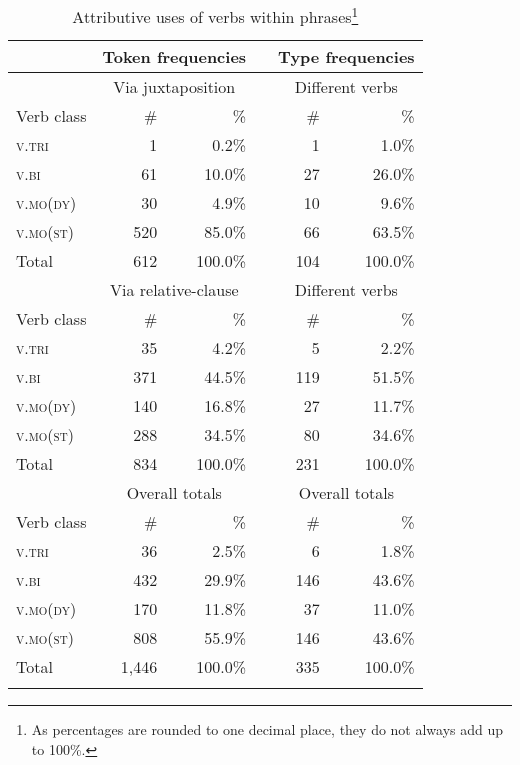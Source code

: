 \begin{table}

\caption[Attributive uses of verbs within  phrases]{Attributive uses of verbs within  phrases\footnote{As percentages are rounded to one decimal place, they do not always add up to 100\%.}}\label{Table_5.16}
\centering
\begin{tabular}{l*{5}{r}}
\lsptoprule
 & \multicolumn{2}{c}{ Token frequencies} & & \multicolumn{2}{c}{Type frequencies}\\
\midrule
 & \multicolumn{2}{c}{ Via juxtaposition} &  & \multicolumn{2}{c}{Different verbs}\\
Verb class &  \# &  \%  & &  \# &  \%\\
\textsc{v.tri} &  1 &  0.2\%  & &  1 &  1.0\%\\
\textsc{v.bi} &  61 &  10.0\% &  &  27 &  26.0\%\\
\textsc{v.mo}(\textsc{dy}) &  30 &  4.9\%  & &  10 &  9.6\%\\
\textsc{v.mo}(\textsc{st}) &  520 &  85.0\% &  &  66 &  63.5\%\\
\midrule
Total &  612 &  100.0\%  & &  104 &  100.0\%\\
\midrule
& \multicolumn{2}{c}{ Via relative-clause}  & & \multicolumn{2}{c}{ Different verbs}\\
Verb class &  \# &  \% &  &  \# &  \%\\
\textsc{v.tri} &  35 &  4.2\% & &   5 &  2.2\%\\
\textsc{v.bi} &  371 &  44.5\% &  &  119 &  51.5\%\\
\textsc{v.mo}(\textsc{dy}) &  140 &  16.8\% &  &  27 &  11.7\%\\
\textsc{v.mo}(\textsc{st}) &  288 &  34.5\% &  &  80 &  34.6\%\\
\midrule
Total &  834 &  100.0\% & &   231 &  100.0\%\\
\midrule
& \multicolumn{2}{c}{ Overall totals} &  & \multicolumn{2}{c}{ Overall totals}\\
Verb class &  \# &  \% & &   \# &  \%\\
\textsc{v.tri} &  36 &  2.5\%  & &  6 &  1.8\%\\
\textsc{v.bi} &  432 &  29.9\%  & &  146 &  43.6\%\\
\textsc{v.mo}(\textsc{dy}) &  170 &  11.8\% & &   37 &  11.0\%\\
\textsc{v.mo}(\textsc{st}) &  808 &  55.9\% &   & 146 &  43.6\%\\
\midrule
Total &  1,446 &  100.0\% &  &  335 &  100.0\%\\
\lspbottomrule
\end{tabular}

\end{table}

